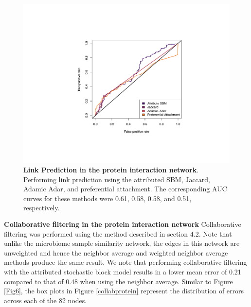 \begin{figure}[h!]
\begin{center}
\includegraphics[width=1\textwidth]{ROC_Protein.pdf}
\caption{{\bf Link Prediction in the protein interaction network}. Performing link prediction using the attributed SBM, Jaccard, Adamic Adar, and preferential attachment. The corresponding AUC curves for these methods were 0.61, 0.58, 0.58, and 0.51, respectively.}
\label{Fig9}
\end{center}
\end{figure}
{\bf Collaborative filtering in the protein interaction network}
Collaborative filtering was performed using the method described in section 4.2. Note that unlike the microbiome sample similarity network, the edges in this network are unweighted and hence the neighbor average and weighted neighbor average methods produce the same result. We note that performing collaborative filtering with the attributed stochastic block model results in a lower mean error of 0.21 compared to that of 0.48 when using the neighbor average. Similar to Figure \ref{Fig6}, the box plots in Figure \ref{collabprotein} represent the distribution of errors across each of the 82 nodes.

